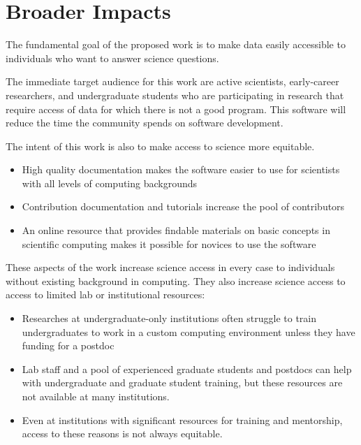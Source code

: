 \section{Broader Impacts}
\label{sec:broad}

The fundamental goal of the proposed work is to make data easily accessible to individuals who want to answer science questions.


The immediate target audience for this work are active scientists, early-career researchers, and undergraduate students who are participating in research that require access of data for which there is not a good program.  This software will reduce the time the community spends on software development.  

The intent of this work is also to make access to science more equitable.  
\begin{itemize}
    \item High quality documentation makes the software easier to use for scientists with all levels of computing backgrounds
    \item Contribution documentation and tutorials increase the pool of contributors
    \item An online resource that provides findable materials on basic concepts in scientific computing makes it possible for novices to use the software
\end{itemize}

These aspects of the work increase science access in every case to individuals without existing background in computing.  They also increase science access to access to limited lab or institutional resources: 

\begin{itemize}
    \item Researches at undergraduate-only institutions often struggle to train undergraduates to work in a custom computing environment unless they have funding for a postdoc
    \item Lab staff and a pool of experienced graduate students and postdocs can help with undergraduate and graduate student training, but these resources are not available at many institutions.
    \item Even at institutions with significant resources for training and mentorship, access to these reasons is not always equitable.  
\end{itemize}

